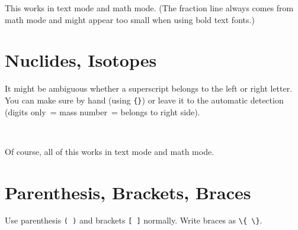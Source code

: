 \documentclass[a4paper,notitlepage,parskip=half]{scrreprt}
\begin{document}
This works in text mode and math mode. (The fraction line always comes from math mode and might appear too small when using bold text fonts.)


\section{Nuclides, Isotopes}

\begin{SideBySideExample}[xrightmargin=2.5cm]
\end{SideBySideExample}

\begin{SideBySideExample}[xrightmargin=2.5cm]
\end{SideBySideExample}

\begin{SideBySideExample}[xrightmargin=2.5cm]
\end{SideBySideExample}

\begin{SideBySideExample}[xrightmargin=2.5cm]
\end{SideBySideExample}

It might be ambiguous whether a superscript belongs to the left or right letter. You can make sure by hand (using \verb|{}|) or leave it to the automatic detection (digits only~= mass number~= belongs to right side).

\begin{SideBySideExample}[xrightmargin=2.5cm]
  \\
\end{SideBySideExample}

Of course, all of this works in text mode and math mode.


\section{Parenthesis, Brackets, Braces}

Use parenthesis \verb|( )| and brackets \verb|[ ]| normally. Write braces as \verb|\{ \}|.

\begin{SideBySideExample}[xrightmargin=4cm]
\end{SideBySideExample}

\begin{SideBySideExample}[xrightmargin=4cm]
\end{SideBySideExample}
\end{document}

